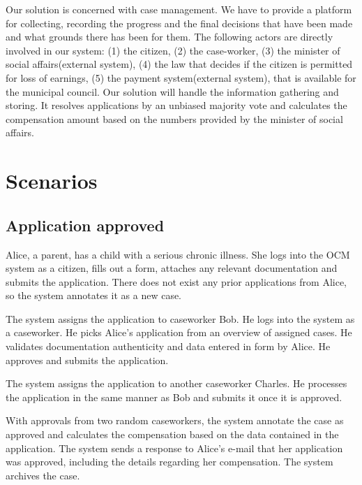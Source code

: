 \documentclass{article}
\begin{document}
\vspace{2mm}

Our solution is concerned with case management. We have to provide a platform for collecting, recording the progress and the final decisions that have been made and what grounds there has been for them. The following actors are directly involved in our system: (1) the citizen, (2) the case-worker, (3) the minister of social affairs(external system), (4) the law that decides if the citizen is permitted for loss of earnings, (5) the payment system(external system), that is available for the municipal council. Our solution will handle the information gathering and storing. It resolves applications by an unbiased majority vote and calculates the compensation amount based on the numbers provided by the minister of social affairs.

\section{Scenarios}

\subsection*{Application approved}

Alice, a parent, has a child with a serious chronic illness. She logs into the OCM system as a citizen, fills out a form, attaches any relevant documentation and submits the application. There does not exist any prior applications from Alice, so the system annotates it as a new case.

\vspace{2mm}

The system assigns the application to caseworker Bob. He logs into the system as a caseworker. He picks Alice's application from an overview of assigned cases. He validates documentation authenticity and data entered in form by Alice. He approves and submits the application.

\vspace{2mm}

The system assigns the application to another caseworker Charles. He processes the application in the same manner as Bob and submits it once it is approved.

\vspace{2mm}

With approvals from two random caseworkers, the system annotate the case as approved and calculates the compensation based on the data contained in the application. The system sends a response to Alice's e-mail that her application was approved, including the details regarding her compensation. The system archives the case.
\end{document}
